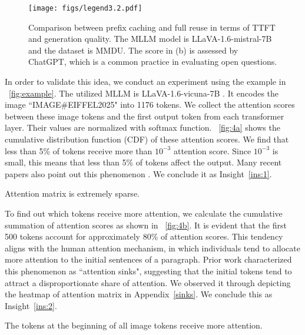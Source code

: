 \begin{figure}[t]
    \centering
    \texttt{[image: figs/legend3.2.pdf]}
    \vskip -0.2in
    \caption{Comparison between prefix caching and full reuse in terms of TTFT and generation quality. The MLLM model is LLaVA-1.6-mistral-7B and the dataset is MMDU. The score in (b) is assessed by ChatGPT, which is a common practice in evaluating open questions.}
    \label{fig:3}
\end{figure}

In order to validate this idea, we conduct an experiment using the example in \figurename~\ref{fig:example}. The utilized MLLM is LLaVA-1.6-vicuna-7B \cite{liu2024llavanext}. It encodes the image ``IMAGE\#EIFFEL2025" into 1176 tokens. We collect the attention scores between these image tokens and the first output token from each transformer layer. Their values are normalized with softmax function. \figurename~\ref{fig:4a} shows the cumulative distribution function (CDF) of these attention scores. We find that less than 5\% of tokens receive more than $10^{-3}$ attention score. Since $10^{-3}$ is small, this means that less than 5\% of tokens affect the output. Many recent papers also point out this phenomenon \cite{zhang2024h2o, Quest-ICML24, longformer}. We conclude it as Insight~\ref{ins:1}.
\begin{insight}\label{ins:1}
    Attention matrix is extremely sparse.
\end{insight}

To find out which tokens receive more attention, we calculate the cumulative summation of attention scores as shown in \figurename~\ref{fig:4b}. It is evident that the first 500 tokens account for approximately 80\% of attention scores. This tendency aligns with the human attention mechanism, in which individuals tend to allocate more attention to the initial sentences of a paragraph. Prior work \cite{xiao2024} characterized this phenomenon as ``attention sinks", suggesting that the initial tokens tend to attract a disproportionate share of attention. We observed it through depicting the heatmap of attention matrix in Appendix~\ref{sinks}. We conclude this as Insight~\ref{ins:2}.
\begin{insight}\label{ins:2}
    The tokens at the beginning of all image tokens receive more attention.
\end{insight}

